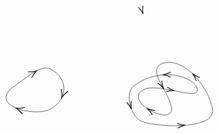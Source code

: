 \documentclass[12pt]{article}
\begin{document}
\[\begin{tikzpicture}[x=0.75pt,y=0.75pt,yscale=-1,xscale=1]
    \draw [shift={(242.13,76.76)}, rotate = 252.08] [color=black  ][line width=0.75]    (10.93,-3.29) .. controls (6.95,-1.4) and (3.31,-0.3) .. (0,0) .. controls (3.31,0.3) and (6.95,1.4) .. (10.93,3.29)   ;
    \draw    (60.26,180.14) .. controls (100.26,150.14) and (108.26,144.14) .. (124.26,159.14) .. controls (140.26,174.14) and (134.26,198.14) .. (114.26,208.14) .. controls (94.26,218.14) and (35.26,205.14) .. (60.26,180.14) -- cycle ;
    \draw [shift={(96.08,155.14)}, rotate = 149.89] [color=black  ][line width=0.75]    (10.93,-4.9) .. controls (6.95,-2.3) and (3.31,-0.67) .. (0,0) .. controls (3.31,0.67) and (6.95,2.3) .. (10.93,4.9)   ;
    \draw [shift={(130.55,191.94)}, rotate = 289.75] [color=black  ][line width=0.75]    (10.93,-4.9) .. controls (6.95,-2.3) and (3.31,-0.67) .. (0,0) .. controls (3.31,0.67) and (6.95,2.3) .. (10.93,4.9)   ;
    \draw [shift={(67.9,206.3)}, rotate = 19.51] [color=black  ][line width=0.75]    (10.93,-4.9) .. controls (6.95,-2.3) and (3.31,-0.67) .. (0,0) .. controls (3.31,0.67) and (6.95,2.3) .. (10.93,4.9)   ;
    \draw    (230.26,175.14) .. controls (266,148.34) and (314.51,163.05) .. (316.59,180.75) .. controls (318.67,198.45) and (254.26,166.14) .. (238.26,184.14) .. controls (222.26,202.14) and (283.26,230.14) .. (281.26,207.14) .. controls (279.26,184.14) and (243.26,151.14) .. (271.26,144.14) .. controls (299.26,137.14) and (331.26,176.14) .. (337.26,207.14) .. controls (343.26,238.14) and (254.26,232.14) .. (239.26,224.14) .. controls (224.26,216.14) and (216.26,185.14) .. (230.26,175.14) -- cycle ;
    \draw [shift={(268.81,160.68)}, rotate = 357.68] [color=black  ][line width=0.75]    (10.93,-3.29) .. controls (6.95,-1.4) and (3.31,-0.3) .. (0,0) .. controls (3.31,0.3) and (6.95,1.4) .. (10.93,3.29)   ;
    \draw [shift={(285.27,182.55)}, rotate = 191.28] [color=black  ][line width=0.75]    (10.93,-3.29) .. controls (6.95,-1.4) and (3.31,-0.3) .. (0,0) .. controls (3.31,0.3) and (6.95,1.4) .. (10.93,3.29)   ;
    \draw [shift={(247.41,206.88)}, rotate = 31.32] [color=black  ][line width=0.75]    (10.93,-3.29) .. controls (6.95,-1.4) and (3.31,-0.3) .. (0,0) .. controls (3.31,0.3) and (6.95,1.4) .. (10.93,3.29)   ;
    \draw [shift={(270.24,179.71)}, rotate = 241.88] [color=black  ][line width=0.75]    (10.93,-3.29) .. controls (6.95,-1.4) and (3.31,-0.3) .. (0,0) .. controls (3.31,0.3) and (6.95,1.4) .. (10.93,3.29)   ;
    \draw [shift={(309.89,158.79)}, rotate = 45.62] [color=black  ][line width=0.75]    (10.93,-3.29) .. controls (6.95,-1.4) and (3.31,-0.3) .. (0,0) .. controls (3.31,0.3) and (6.95,1.4) .. (10.93,3.29)   ;
    \draw [shift={(300.31,229.97)}, rotate = 176.13] [color=black  ][line width=0.75]    (10.93,-3.29) .. controls (6.95,-1.4) and (3.31,-0.3) .. (0,0) .. controls (3.31,0.3) and (6.95,1.4) .. (10.93,3.29)   ;
    \draw [shift={(226.13,207.76)}, rotate = 252.08] [color=black  ][line width=0.75]    (10.93,-3.29) .. controls (6.95,-1.4) and (3.31,-0.3) .. (0,0) .. controls (3.31,0.3) and (6.95,1.4) .. (10.93,3.29)   ;
    

\end{tikzpicture}\]
\end{document}
